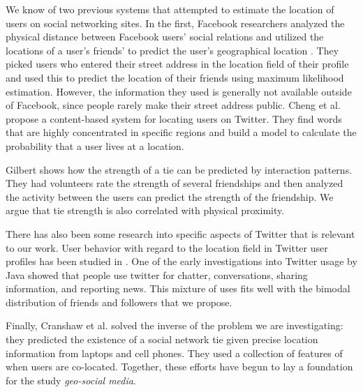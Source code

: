 We know of two previous systems that attempted to estimate the location of
users on social networking sites.  In the first, Facebook researchers analyzed
the physical distance between Facebook users' social relations and utilized the
locations of a user's friends' to predict the user's geographical location
\cite{backstrom2010find}.  They picked users who entered their street address
in the location field of their profile and used this to predict the location of
their friends using maximum likelihood estimation.  However, the information
they used is generally not available outside of Facebook, since people rarely
make their street address public.  Cheng et al. \cite{cheng2010you} propose a
content-based system for locating users on Twitter. They find words that are
highly concentrated in specific regions and build a model to calculate the
probability that a user lives at a location.

Gilbert \cite{gilbert2009predicting} shows how the strength of a tie can be
predicted by interaction patterns.  They had volunteers rate the strength of
several friendships and then analyzed the activity between the users can
predict the strength of the friendship.  We argue that tie strength is also
correlated with physical proximity.

There has also been some research into specific aspects of Twitter that is
relevant to our work.  User behavior with regard to the location field in
Twitter user profiles has been studied in \cite{hecht2011tweets}.  One of the
early investigations into Twitter usage by Java \cite{java2007we} showed that
people use twitter for chatter, conversations, sharing information, and
reporting news.  This mixture of uses fits well with the bimodal distribution
of friends and followers that we propose.

Finally, Cranshaw et al. \cite{cranshaw2010bridging} solved the inverse of the
problem we are investigating: they predicted the existence of a social network
tie given precise location information from laptops and cell phones. They used
a collection of features of when users are co-located.  Together, these efforts
have begun to lay a foundation for the study \textit{geo-social media}.

